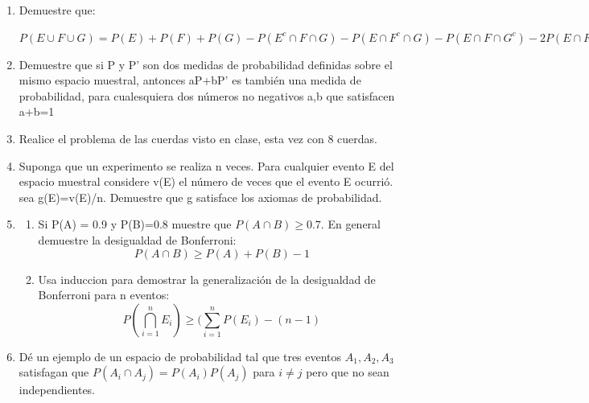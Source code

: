 \documentclass[12pt,a4paper]{report}
\begin{document}
\begin{enumerate}
   \item {
    Demuestre que:\\
	\begin{center}
	$P(E \cup F \cup G) = P(E) + P(F) + P(G) - P(E^c \cap F \cap G) -P(E \cap F^c \cap G) - P(E \cap F \cap G^c)-2P(E \cap F \cap G)$
	\end{center}
	}

   \item {
    Demuestre que si P y P' son dos medidas de probabilidad definidas sobre el mismo espacio muestral, antonces aP+bP' es también una medida de probabilidad, para cualesquiera dos números no negativos a,b que satisfacen a+b=1\\
	}

   \item {
    Realice el problema de las cuerdas visto en clase, esta vez con 8 cuerdas.\\
	}


   \item {
   	Suponga que un experimento se realiza n veces. Para cualquier evento E del espacio muestral considere v(E) el número de veces que el evento E ocurrió. sea g(E)=v(E)/n. Demuestre que g satisface los axiomas de probabilidad.\\
	}

   \item {
  	\begin{enumerate}[label=\alph*) ]
   \item {
	Si P(A) = 0.9 y P(B)=0.8 muestre que $P(A \cap B) \geq 0.7$. En general demuestre la desigualdad de Bonferroni:\\
	$$P(A \cap B) \geq P(A)+P(B) -1$$
   }

   \item {
 Usa induccion para demostrar la generalización de la desigualdad de Bonferroni para n eventos:\\
 $$P(\bigcap\limits_{i=1}^{n} E_{i}) \geq (\sum_{i=1}^{n} P(E_{i})-(n-1)$$

   }




	\end{enumerate}
	}

  \item{
  Dé un ejemplo de un espacio de probabilidad tal que tres eventos $A_{1},A_{2},A_{3}$ satisfagan que $P(A_{i} \cap A_{j})=P(A_{i})P(A_{j})$ para $i\neq j$ pero que no sean independientes.
  }



\end{enumerate}
\end{document}
